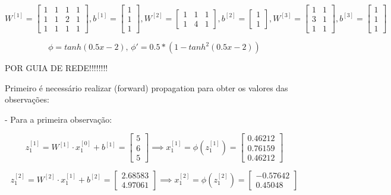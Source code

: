\documentclass[a4paper,12pt]{article} %
\begin{document}
\begin{enumerate}
\begin{equation*}
    W^{[1]} = \begin{bmatrix} 1 & 1 & 1 & 1 \\ 1 & 1 & 2 & 1 \\ 1 & 1 & 1 & 1 \end{bmatrix} , b^{[1]} = \begin{bmatrix} 1 \\ 1 \\ 1 \end{bmatrix}, W^{[2]} = \begin{bmatrix} 1 & 1 & 1 \\ 1 & 4 & 1 \end{bmatrix} , b^{[2]} = \begin{bmatrix} 1 \\ 1 \end{bmatrix}, W^{[3]} = \begin{bmatrix} 1 & 1 \\ 3 & 1 \\ 1 & 1 \end{bmatrix} , b^{[3]} = \begin{bmatrix} 1 \\ 1 \\ 1 \end{bmatrix}
\end{equation*}

\begin{equation*}
    \phi = tanh(0.5x -2) \text{, } \phi' = 0.5 * (1 - tanh^2(0.5x -2))
\end{equation*}

POR GUIA DE REDE!!!!!!!!

Primeiro é necessário realizar (forward) propagation para obter os valores das observações:

- Para a primeira observação:

\begin{equation*}
    z^{[1]}_1 = W^{[1]} \cdot x^{[0]}_1 + b^{[1]} = \begin{bmatrix} 5 \\ 6 \\ 5 \end{bmatrix} \implies x^{[1]}_1 = \phi(z^{[1]}_1)= \begin{bmatrix} 0.46212 \\ 0.76159 \\ 0.46212 \end{bmatrix}
\end{equation*}

\begin{equation*}
    z^{[2]}_1 = W^{[2]} \cdot x^{[1]}_1 + b^{[2]} = \begin{bmatrix} 2.68583 \\ 4.97061 \end{bmatrix} \implies x^{[2]}_1 = \phi(z^{[2]}_1)= \begin{bmatrix} -0.57642 \\ 0.45048 \end{bmatrix}
\end{equation*}


\end{enumerate}
\end{document}
